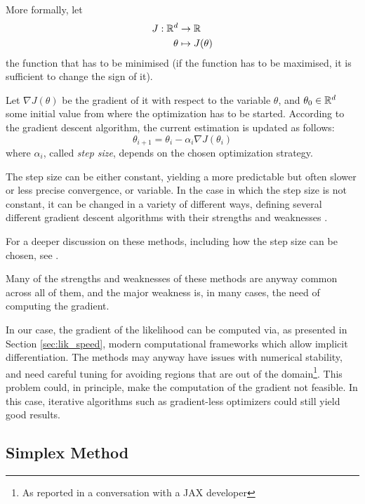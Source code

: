 More formally, let
\begin{align*}
  J: \mathbb{R}^d & \rightarrow \mathbb{R} \\
  \theta & \mapsto J(\theta)
\end{align*}
the function that has to be minimised
(if the function has to be maximised, it is sufficient to change the sign of it).

Let \(\nabla J(\theta)\) be the gradient of it with respect to the variable \(\theta\),
and \(\theta_0 \in \mathbb{R}^d\) some initial value from where the optimization has to be started.
According to the gradient descent algorithm,
the current estimation is updated as follows:
\begin{equation}
  \label{eq:grad_desc}
  \theta_{i+1} = \theta_i - \alpha_i\nabla J(\theta_i)
\end{equation}
where \(\alpha_i\), called \textit{step size}, depends on the chosen optimization strategy.

The step size can be either constant, yielding a more predictable but often slower or less precise convergence,
or variable.
In the case in which the step size is not constant,
it can be changed in a variety of different ways,
defining several different gradient descent algorithms with their strengths and weaknesses
\parencite{doi:10.1137/1011036,MR701288}.

For a deeper discussion on these methods, including how the step size can be chosen,
see \cite{10.5555/3317111}.

Many of the strengths and weaknesses of these methods are anyway common across all of them,
and the major weakness is, in many cases,
the need of computing the gradient.

In our case, the gradient of the likelihood can be computed via, as presented in Section \ref{sec:lik_speed},
modern computational frameworks which allow implicit differentiation.
The methods may anyway have issues with numerical stability,
and need careful tuning for avoiding regions that are out of the domain\footnote{As reported in a conversation with a JAX developer}.
This problem could, in principle,
make the computation of the gradient not feasible.
In this case, iterative algorithms such as gradient-less optimizers could still yield good results.

\subsection{Simplex Method}
\label{sec:no_grad_opt}


